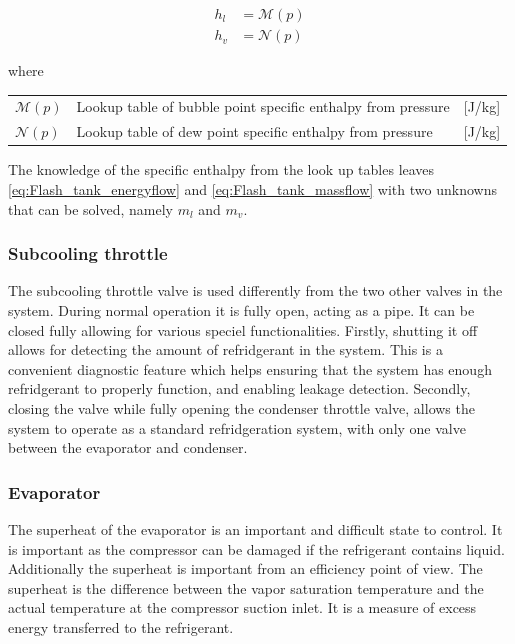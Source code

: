 \begin{align}
	h_{l}  & = \mathcal{M}(p)\\
	h_{v}  & = \mathcal{N}(p)
\end{align}

where

\begin{center}
	\begin{tabular}{l p{8cm} l}
		$\mathcal{M}(p)$ & Lookup table of bubble point specific enthalpy from pressure & [\si{J}/\si{kg}] \\
		$\mathcal{N}(p)$ & Lookup table of dew point specific enthalpy from pressure    & [\si{J}/\si{kg}]
	\end{tabular}
\end{center}

The knowledge of the specific enthalpy from the look up tables leaves \cref{eq:Flash_tank_energyflow} and \cref{eq:Flash_tank_massflow} with two unknowns that can be solved, namely $ m_l $ and $ m_v $.

\subsubsection{Subcooling throttle}
The subcooling throttle valve is used differently from the two other valves in the system. During normal operation it is fully open, acting as a pipe. It can be closed fully allowing for various speciel functionalities. Firstly, shutting it off allows for detecting the amount of refridgerant in the system. This is a convenient diagnostic feature which helps ensuring that the system has enough refridgerant to properly function, and enabling leakage detection. Secondly, closing the valve while fully opening the condenser throttle valve, allows the system to operate as a standard refridgeration system, with only one valve between the evaporator and condenser.


\subsubsection{Evaporator}
The superheat of the evaporator is an important and difficult state to control. It is important as the compressor can be damaged if the refrigerant contains liquid. Additionally the superheat is important from an efficiency point of view.
The superheat is the difference between the vapor saturation temperature and the actual temperature at the compressor suction inlet. It is a measure of excess energy transferred to the refrigerant.

